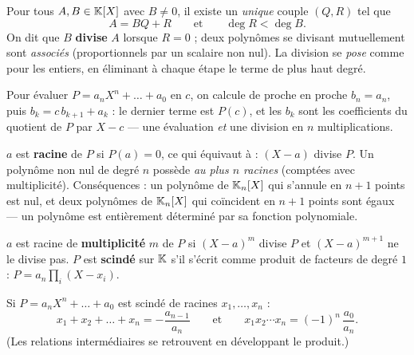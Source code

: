 
\begin{theoreme}
Pour tous $A,B\in\mathbb{K}[X]$ avec $B\neq0$, il existe un \emph{unique} couple
$(Q,R)$ tel que
\[
  A=BQ+R\qquad\text{et}\qquad\deg R<\deg B.
\]
On dit que $B$ \textbf{divise} $A$ lorsque $R=0$ ; deux polynômes se
divisant mutuellement sont \emph{associés} (proportionnels par un scalaire
non nul). La division se \emph{pose} comme pour les entiers, en éliminant à
chaque étape le terme de plus haut degré.
\end{theoreme}

\begin{savoirfaire}
Pour évaluer $P=a_nX^{n}+\dots+a_0$ en $c$, on calcule de proche en proche
$b_n=a_n$, puis $b_{k}=c\,b_{k+1}+a_{k}$ : le dernier terme est $P(c)$, et
les $b_k$ sont les coefficients du quotient de $P$ par $X-c$ — une
évaluation \emph{et} une division en $n$ multiplications.
\end{savoirfaire}


\begin{theoreme}
$a$ est \textbf{racine} de $P$ si $P(a)=0$, ce qui équivaut à :
$(X-a)$ divise $P$. Un polynôme non nul de degré $n$ possède \emph{au plus
$n$ racines} (comptées avec multiplicité). Conséquences : un polynôme de
$\mathbb{K}_n[X]$ qui s'annule en $n+1$ points est nul, et deux polynômes de
$\mathbb{K}_n[X]$ qui coïncident en $n+1$ points sont égaux — un polynôme est
entièrement déterminé par sa fonction polynomiale.
\end{theoreme}

\begin{definition}
$a$ est racine de \textbf{multiplicité} $m$ de $P$ si $(X-a)^{m}$ divise
$P$ et $(X-a)^{m+1}$ ne le divise pas. $P$ est \textbf{scindé} sur $\mathbb{K}$
s'il s'écrit comme produit de facteurs de degré $1$ :
$P=a_n\prod_{i}(X-x_i)$.
\end{definition}

\begin{theoreme}
Si $P=a_nX^{n}+\dots+a_0$ est scindé de racines $x_1,\dots,x_n$ :
\[
  x_1+x_2+\dots+x_n=-\frac{a_{n-1}}{a_n}
  \qquad\text{et}\qquad
  x_1x_2\cdots x_n=(-1)^{n}\,\frac{a_0}{a_n}.
\]
(Les relations intermédiaires se retrouvent en développant le produit.)
\end{theoreme}

